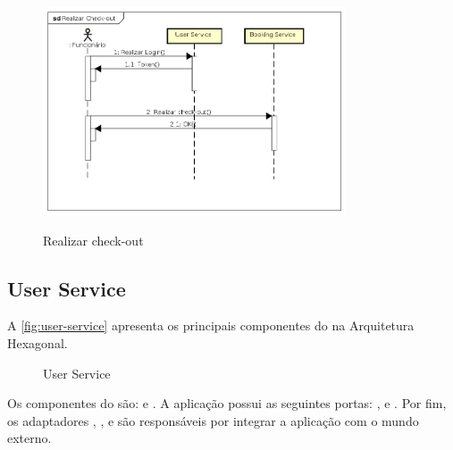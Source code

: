 \begin{figure}[H]
    \centering
    \caption{Realizar check-out}
    \includegraphics[width=0.8\textwidth]{media/realizar-checkout.png}
    \label{fig:realizar-checkout}
\end{figure}

\subsection{User Service}
A \autoref{fig:user-service} apresenta os principais componentes do  na Arquitetura Hexagonal.

\begin{figure}[H]
    \centering
    \caption{User Service}
    \label{fig:user-service}
\end{figure}

Os componentes do  são:  e . A aplicação possui as seguintes portas: ,  e . Por fim, os adaptadores , ,  e  são responsáveis por integrar a aplicação com o mundo externo.

